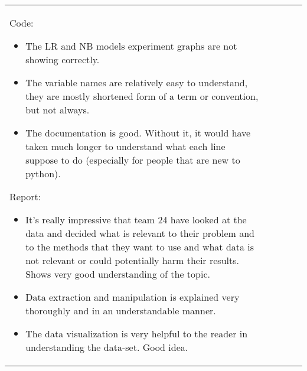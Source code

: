 \documentclass{handout}
\begin{document}
\begin{tabular}{p{12.5cm}cccc}
{		Code:
		\begin{itemize}
			\item The LR and NB models experiment graphs are not showing correctly.
			\item The variable names are relatively easy to understand, they are mostly shortened form of a term or convention, but not always.
			\item The documentation is good. Without it, it would have taken much longer to understand what each line suppose to do (especially for people that are new to python).
		\end{itemize}
	
		Report:
		\begin{itemize}
		\item It's really impressive that team 24 have looked at the data and decided what is relevant to their problem and to the methods that they want to use and what data is not relevant or could potentially harm their results. Shows very good understanding of the topic. 
		\item Data extraction and manipulation is explained very thoroughly and in an understandable manner.
		\item The data visualization is very helpful to the reader in understanding the data-set. Good idea.
		\end{itemize}		
	}
\end{tabular}
\end{document}
